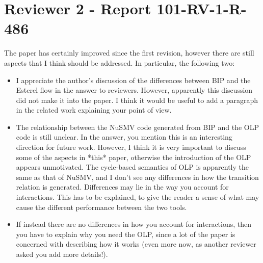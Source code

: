 \section{Reviewer 2 - Report 101-RV-1-R-486}
%
%
The paper has certainly improved since the first revision, however there are
still aspects that I think should be addressed. In particular, the following
two:

\begin{itemize}
\item I appreciate the author's discussion of the differences between BIP and the
Esterel flow in the answer to reviewers. However, apparently this discussion
did not make it into the paper. I think it would be useful to add a paragraph
in the related work explaining your point of view.


\item The relationship between the NuSMV code generated from BIP and the OLP code
is still unclear. In the answer, you mention this is an interesting direction
for future work. However, I think it is very important to discuss some of the
aspects in *this* paper, otherwise the introduction of the OLP appears
unmotivated. 
The cycle-based semantics of OLP is apparently the same as that
of NuSMV, and I don't see any differences in how the transition relation is
generated. Differences may lie in the way you account for interactions. This
has to be explained, to give the reader a sense of what may cause the
different performance between the two tools. 

    
\item If instead there are no
differences in how you account for interactions, then you have to explain why
you need the OLP, since a lot of the paper is concerned with describing how it
works (even more now, as another reviewer asked you add more details!).



\end{itemize}
